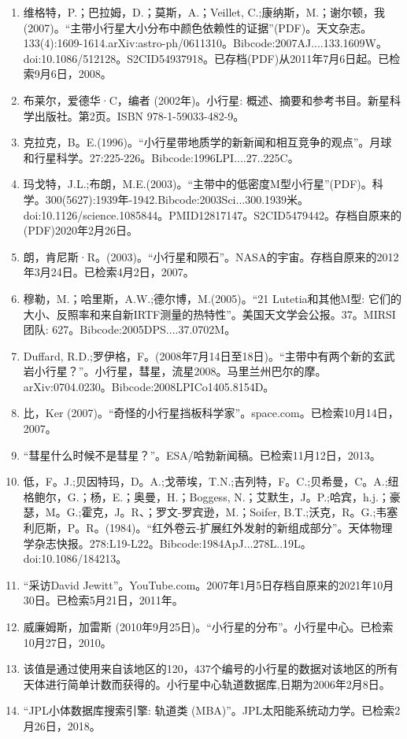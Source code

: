 \begin{enumerate}
\item 维格特，P.；巴拉姆，D.；莫斯，A.；Veillet, C.;康纳斯，M.；谢尔顿，我(2007)。“主带小行星大小分布中颜色依赖性的证据”(PDF)。天文杂志。133(4):1609-1614.arXiv:astro-ph/0611310。Bibcode:2007AJ....133.1609W。doi:10.1086/512128。S2CID54937918。已存档(PDF)从2011年7月6日起。已检索9月6日，2008。  
\item 布莱尔，爱德华·C，编者 (2002年)。小行星: 概述、摘要和参考书目。新星科学出版社。第2页。ISBN 978-1-59033-482-9。
\item 克拉克，B。E.(1996)。“小行星带地质学的新新闻和相互竞争的观点”。月球和行星科学。27:225-226。Bibcode:1996LPI....27..225C。
\item 玛戈特，J.L.;布朗，M.E.(2003)。“主带中的低密度M型小行星”(PDF)。科学。300(5627):1939年-1942.Bibcode:2003Sci...300.1939米。doi:10.1126/science.1085844。PMID12817147。S2CID5479442。存档自原来的(PDF)2020年2月26日。   
\item  朗，肯尼斯·R。(2003)。“小行星和陨石”。NASA的宇宙。存档自原来的2012年3月24日。已检索4月2日，2007。
\item 穆勒，M.；哈里斯，A.W.;德尔博，M.(2005)。“21 Lutetia和其他M型: 它们的大小、反照率和来自新IRTF测量的热特性”。美国天文学会公报。37。MIRSI团队: 627。Bibcode:2005DPS....37.0702M。
\item Duffard, R.D.;罗伊格，F。(2008年7月14日至18日)。“主带中有两个新的玄武岩小行星？”。小行星，彗星，流星2008。马里兰州巴尔的摩。arXiv:0704.0230。Bibcode:2008LPICo1405.8154D。
\item 比，Ker (2007)。“奇怪的小行星挡板科学家”。space.com。已检索10月14日，2007。
\item “彗星什么时候不是彗星？”。ESA/哈勃新闻稿。已检索11月12日，2013。
\item 低，F。J.;贝因特玛，D。A.;戈蒂埃，T.N.;吉列特，F。C.;贝希曼，C。A.;纽格鲍尔，G.；杨，E.；奥曼，H.；Boggess, N.；艾默生，J。P.;哈宾，h.j.；豪瑟，M。G.;霍克，J。R、；罗文-罗宾逊，M.；Soifer, B.T.;沃克，R。G.;韦塞利厄斯，P。R。(1984)。“红外卷云-扩展红外发射的新组成部分”。天体物理学杂志快报。278:L19-L22。Bibcode:1984ApJ...278L..19L。doi:10.1086/184213。
\item “采访David Jewitt”。YouTube.com。2007年1月5日存档自原来的2021年10月30日。已检索5月21日，2011年。
\item 威廉姆斯，加雷斯 (2010年9月25日)。“小行星的分布”。小行星中心。已检索10月27日，2010。
\item 该值是通过使用来自该地区的120，437个编号的小行星的数据对该地区的所有天体进行简单计数而获得的。小行星中心轨道数据库,日期为2006年2月8日。
\item “JPL小体数据库搜索引擎: 轨道类 (MBA)”。JPL太阳能系统动力学。已检索2月26日，2018。

\end{enumerate}
